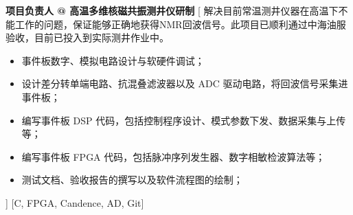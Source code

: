 \begin{experiences}
    {\textbf{项目负责人 @ 高温多维核磁共振测井仪研制 }}%
    [
    解决目前常温测井仪器在高温下不能工作的问题，保证能够正确地获得NMR回波信号。此项目已顺利通过中海油服验收，目前已投入到实际测井作业中。
    \begin{itemize}
    	\item {事件板数字、模拟电路设计与软硬件调试；}
    	\item {设计差分转单端电路、抗混叠滤波器以及 ADC 驱动电路，将回波信号采集进事件板；}
    	\item {编写事件板 DSP 代码，包括控制程序设计、模式参数下发、数据采集与上传等；}
    	\item {编写事件板 FPGA 代码，包括脉冲序列发生器、数字相敏检波算法等；}
    	\item {测试文档、验收报告的撰写以及软件流程图的绘制；}
    \end{itemize}]
    [C, FPGA, Candence, AD, Git]
    
    
\end{experiences}